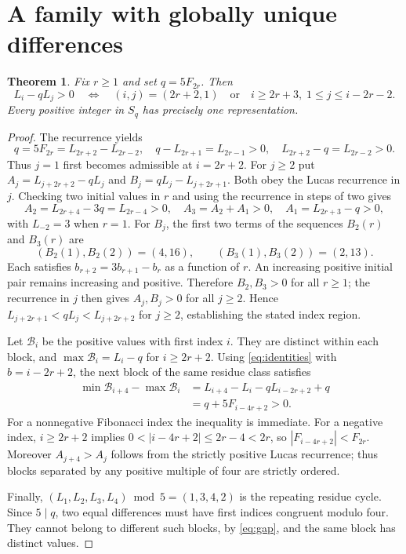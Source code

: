 \documentclass[11pt]{article}
\newtheorem{theorem}{Theorem}[section]
\begin{document}
\section{A family with globally unique differences}
\begin{theorem}\label{thm:unique}
Fix $r\ge1$ and set $q=5F_{2r}$. Then
\[
L_i-qL_j>0\quad\Longleftrightarrow\quad
(i,j)=(2r+2,1)\quad\text{or}\quad
i\ge2r+3,\;1\le j\le i-2r-2.
\]
Every positive integer in $S_q$ has precisely one representation.
\end{theorem}
\begin{proof}
The recurrence yields
\begin{equation}\label{eq:q}
q=5F_{2r}=L_{2r+2}-L_{2r-2},
\quad q-L_{2r+1}=L_{2r-1}>0,
\quad L_{2r+2}-q=L_{2r-2}>0.
\end{equation}
Thus $j=1$ first becomes admissible at $i=2r+2$.
For $j\ge2$ put
$A_j=L_{j+2r+2}-qL_j$ and
$B_j=qL_j-L_{j+2r+1}$.
Both obey the Lucas recurrence in $j$. Checking two initial values
in $r$ and using the recurrence in steps of two gives
\[
A_2=L_{2r+4}-3q=L_{2r-4}>0,
\quad A_3=A_2+A_1>0,\quad A_1=L_{2r+3}-q>0,
\]
with $L_{-2}=3$ when $r=1$.
For $B_j$, the first two terms of the sequences $B_2(r)$
and $B_3(r)$ are
\[
(B_2(1),B_2(2))=(4,16),\qquad
(B_3(1),B_3(2))=(2,13).
\]
Each satisfies $b_{r+2}=3b_{r+1}-b_r$ as a function of $r$.
An increasing positive initial pair remains increasing and positive.
Therefore $B_2,B_3>0$ for all $r\ge1$; the recurrence in $j$
then gives $A_j,B_j>0$ for all $j\ge2$.
Hence $L_{j+2r+1}<qL_j<L_{j+2r+2}$ for $j\ge2$,
establishing the stated index region.

Let $\mathcal B_i$ be the positive values with first index $i$.
They are distinct within each block, and
$\max\mathcal B_i=L_i-q$ for $i\ge2r+2$.
Using \eqref{eq:identities} with $b=i-2r+2$, the next block
of the same residue class satisfies
\begin{align}\label{eq:gap}
\min\mathcal B_{i+4}-\max\mathcal B_i
&=L_{i+4}-L_i-qL_{i-2r+2}+q\\
&=q+5F_{i-4r+2}>0.\nonumber
\end{align}
For a nonnegative Fibonacci index the inequality is immediate.
For a negative index, $i\ge2r+2$ implies
$0<|i-4r+2|\le2r-4<2r$, so
$|F_{i-4r+2}|<F_{2r}$.
Moreover $A_{j+4}>A_j$ follows from the strictly positive
Lucas recurrence; thus blocks separated by any positive multiple
of four are strictly ordered.

Finally, $(L_1,L_2,L_3,L_4)\bmod5=(1,3,4,2)$
is the repeating residue cycle. Since $5\mid q$,
two equal differences must have first indices congruent modulo four.
They cannot belong to different such blocks, by \eqref{eq:gap},
and the same block has distinct values.
\end{proof}
\end{document}
